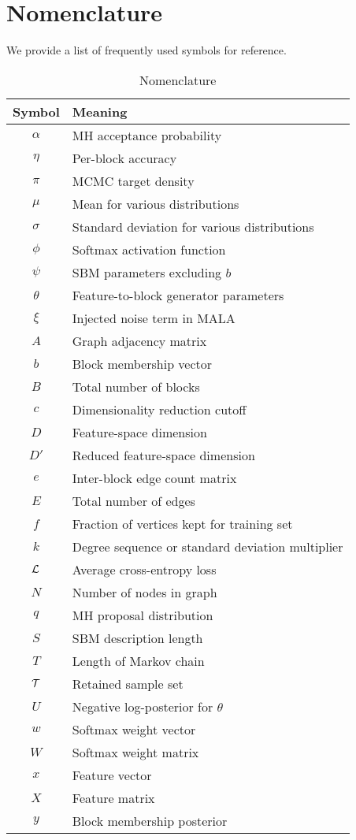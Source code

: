 \section*{Nomenclature}

We provide a list of frequently used symbols for reference.

\begin{table}[!h]
	\centering
	\caption{Nomenclature}
	\label{tab:nomenclature}
	\begin{tabular}{c|l}
			  Symbol & Meaning \\ \hline
			  $\alpha$ & MH acceptance probability\\
			  $\eta$ & Per-block accuracy \\
			  $\pi$ & MCMC target density \\
			  $\mu$ & Mean for various distributions \\
			  $\sigma$ & Standard deviation for various distributions \\
			  $\phi$ & Softmax activation function \\
			  $\psi$ & SBM parameters excluding $b$ \\
			  $\theta$ & Feature-to-block generator parameters \\
			  $\xi$ & Injected noise term in MALA\\
			  $A$ & Graph adjacency matrix \\
			  $b$ & Block membership vector\\
			  $B$ & Total number of blocks \\
			  $c$ & Dimensionality reduction cutoff \\
			  $D$ & Feature-space dimension \\
			  $D'$ & Reduced feature-space dimension \\
			  $e$ & Inter-block edge count matrix \\
			  $E$ & Total number of edges \\
			  $f$ & Fraction of vertices kept for training set\\
			  $k$ & Degree sequence or standard deviation multiplier\\
			  $\mathcal{L}$ & Average cross-entropy loss\\
			  $N$ & Number of nodes in graph \\
			  $q$ & MH proposal distribution\\
			  $S$ & SBM description length\\
			  $T$ & Length of Markov chain\\
			  $\mathcal{T}$ & Retained sample set\\
			  $U$ & Negative log-posterior for $\theta$ \\
			  $w$ & Softmax weight vector\\
			  $W$ & Softmax weight matrix\\
			  $x$ & Feature vector \\
			  $X$ & Feature matrix \\
			  $y$ & Block membership posterior \\
	\end{tabular}
\end{table}